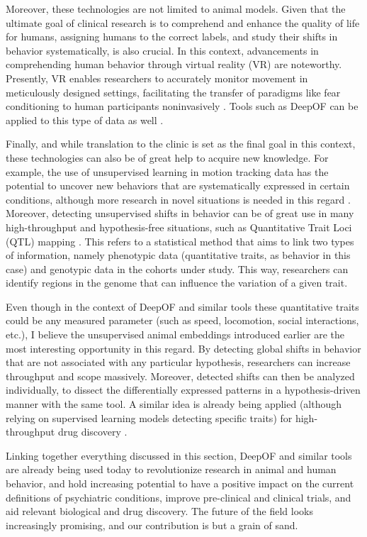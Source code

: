 Moreover, these technologies are not limited to animal models. Given that the ultimate goal of clinical research is to comprehend and enhance the quality of life for humans, assigning humans to the correct labels, and study their shifts in behavior systematically, is also crucial. In this context, advancements in comprehending human behavior through virtual reality (VR) are noteworthy. Presently, VR enables researchers to accurately monitor movement in meticulously designed settings, facilitating the transfer of paradigms like fear conditioning to human participants noninvasively \cite{Binder2022FacingPhobia, Rubio2023Auto-EncodersPerspectives}. Tools such as DeepOF can be applied to this type of data as well \cite{Sahili2023Spatio-TemporalSurvey}.

Finally, and while translation to the clinic is set as the final goal in this context, these technologies can also be of great help to acquire new knowledge. For example, the use of unsupervised learning in motion tracking data has the potential to uncover new behaviors that are systematically expressed in certain conditions, although more research in novel situations is needed in this regard \cite{Mathis2020APerspectives}. Moreover, detecting unsupervised shifts in behavior can be of great use in many high-throughput and hypothesis-free situations, such as Quantitative Trait Loci (QTL) mapping \cite{Abiola2003TheView}. This refers to a statistical method that aims to link two types of information, namely phenotypic data (quantitative traits, as behavior in this case) and genotypic data in the cohorts under study. This way, researchers can identify regions in the genome that can influence the variation of a given trait.

Even though in the context of DeepOF and similar tools these quantitative traits could be any measured parameter (such as speed, locomotion, social interactions, etc.), I believe the unsupervised animal embeddings introduced earlier are the most interesting opportunity in this regard. By detecting global shifts in behavior that are not associated with any particular hypothesis, researchers can increase throughput and scope massively. Moreover, detected shifts can then be analyzed individually, to dissect the differentially expressed patterns in a hypothesis-driven manner with the same tool. A similar idea is already being applied (although relying on supervised learning models detecting specific traits) for high-throughput drug discovery \cite{IndustrializingDiscovery}.

Linking together everything discussed in this section, DeepOF and similar tools are already being used today to revolutionize research in animal and human behavior, and hold increasing potential to have a positive impact on the current definitions of psychiatric conditions, improve pre-clinical and clinical trials, and aid relevant biological and drug discovery. The future of the field looks increasingly promising, and our contribution is but a grain of sand.